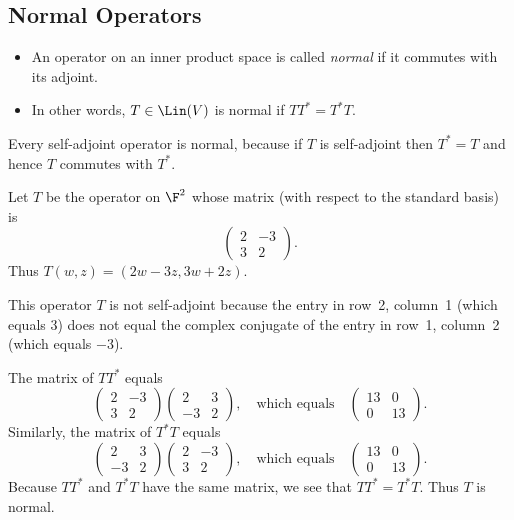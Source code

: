 \subsection{Normal Operators}

\begin{definition}[Normal]\label{ax:7.18}\leavevmode
\begin{itemize}
\item An operator on an inner product space is called \emph{normal} if it
  commutes with its adjoint.
\item In other words, $T\in\Lin(V)$ is normal if $TT^*=T^*T$.
\end{itemize}
\end{definition}

Every self-adjoint operator is normal, because if $T$ is self-adjoint then
$T^*=T$ and hence $T$ commutes with $T^*$.

\begin{example}\label{ax:7.19}
Let $T$ be the operator on $\F^2$ whose matrix (with respect to the standard
basis) is
\[ \begin{pmatrix} 2 & -3\\ 3 & 2 \end{pmatrix}. \]
Thus $T(w,z)=(2w-3z,3w+2z)$.

This operator $T$ is not self-adjoint because the entry in row~2, column~1
(which equals $3$) does not equal the complex conjugate of the entry in row~1,
column~2 (which equals $-3$).

The matrix of $TT^*$ equals
\[ \begin{pmatrix} 2 & -3\\ 3 & 2 \end{pmatrix}
   \begin{pmatrix} 2 & 3\\ -3 & 2 \end{pmatrix},
   \quad\text{which equals}\quad
   \begin{pmatrix} 13 & 0\\ 0 & 13 \end{pmatrix}. \]
Similarly, the matrix of $T^*T$ equals
\[ \begin{pmatrix} 2 & 3\\ -3 & 2 \end{pmatrix}
   \begin{pmatrix} 2 & -3\\ 3 & 2 \end{pmatrix},
   \quad\text{which equals}\quad
   \begin{pmatrix} 13 & 0\\ 0 & 13 \end{pmatrix}. \]
Because $TT^*$ and $T^*T$ have the same matrix, we see that $TT^*=T^*T$. Thus
$T$ is normal.
\end{example}

